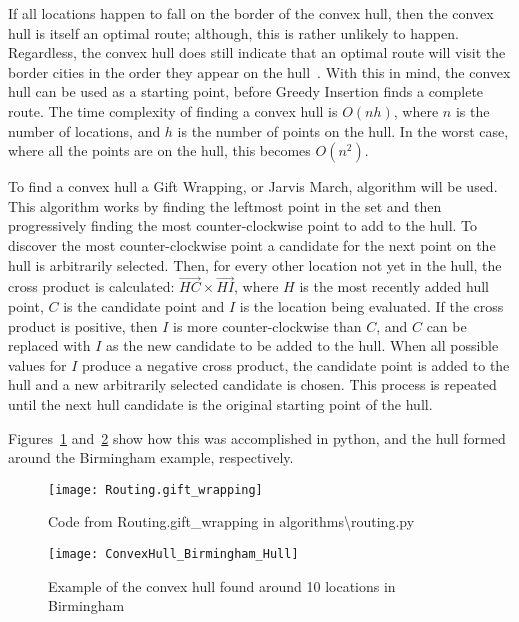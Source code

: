 \noindent
If all locations happen to fall on the border of the convex hull, then the convex hull is itself an optimal route;
although, this is rather unlikely to happen.
Regardless, the convex hull does still indicate that an optimal route will visit the border cities in the order they
appear on the hull~\parencite[p. 46]{applegate2006traveling}.
With this in mind, the convex hull can be used as a starting point, before Greedy Insertion finds a complete route.
The time complexity of finding a convex hull is $O(nh)$\parencite[p. 1029]{cormen2022introduction}, where $n$ is the
number of locations, and $h$ is the number of points on the hull.
In the worst case, where all the points are on the hull, this becomes $O(n^2)$.

To find a convex hull a Gift Wrapping, or Jarvis March, algorithm will be used.
This algorithm works by finding the leftmost point in the set and then progressively finding the most counter-clockwise
point to add to the hull.
To discover the most counter-clockwise point a candidate for the next point on the hull is arbitrarily selected.
Then, for every other location not yet in the hull, the cross product is calculated: $\vec{HC} \times \vec{HI}$, where
$H$ is the most recently added hull point, $C$ is the candidate point and $I$ is the location being evaluated.
If the cross product is positive, then $I$ is more counter-clockwise than $C$, and $C$ can be replaced with $I$ as
the new candidate to be added to the hull.
When all possible values for $I$ produce a negative cross product, the candidate point is added to the hull and a new
arbitrarily selected candidate is chosen.
This process is repeated until the next hull candidate is the original starting point of the hull.

Figures~\ref{fig:Routing.gift_wrapping} and~\ref{fig:ConvexHull_Birmingham_Hull} show how this was accomplished in
python, and the hull formed around the Birmingham example, respectively.
\begin{figure}[H]
    \centering
    \texttt{[image: Routing.gift\_wrapping]}
    \caption{Code from Routing.gift\_wrapping in algorithms\textbackslash routing.py}
    \label{fig:Routing.gift_wrapping}
\end{figure}
\begin{figure}[H]
    \centering
    \texttt{[image: ConvexHull\_Birmingham\_Hull]}
    \caption{Example of the convex hull found around 10 locations in Birmingham}
    \label{fig:ConvexHull_Birmingham_Hull}
\end{figure}

